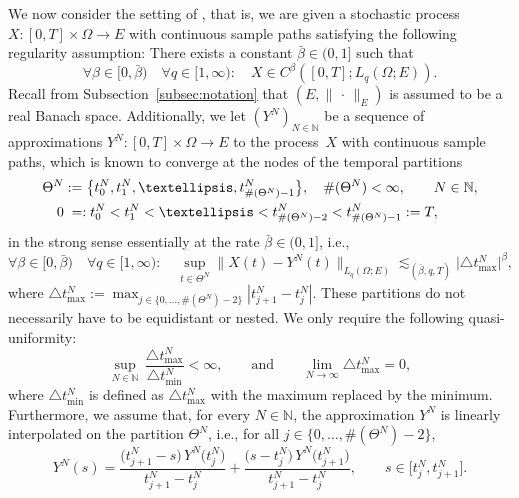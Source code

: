 \documentclass[reqno]{amsart}
\numberwithin{equation}{section}
\newcommand{\bbN}{\mathbb{N}}
\newcommand{\norm}[2]{     \| #1       \|_{ #2 }}
\newcommand{\from}{\colon}
\theoremstyle{remark}
\theoremstyle{definition}
\begin{document}
We now consider the 
setting of \cite[Section~5]{CoxEtAl2021}, 
that is, we are given  
a stochastic process 
$X\from[0,T]\times \Omega \to E$
with continuous sample paths 
satisfying the following regularity assumption: 
There exists a constant $\bar{\beta}\in(0,1]$ 
such that  
% 
\begin{equation}\label{eq:ass:X-beta-regularity} 
\forall \beta\in [0, \bar{\beta}) 
\quad 
\forall 
q\in[1,\infty): 
\quad 
X\in C^{\beta}([0,T];L_q(\Omega;E)). 
\end{equation}
%
Recall from Subsection~\ref{subsec:notation} 
that $(E,\norm{\,\cdot\,}{E})$  
is assumed to be a real Banach space. 
Additionally, we let 
$(Y^N)_{N\in\bbN}$ 
be a sequence 
of approximations 
$Y^N\!\from[0,T]\times\Omega\to E$ 
to the process~$X$ 
with continuous sample paths, 
which is known to converge at 
the nodes of the temporal partitions    
%
\begin{align*}
\Theta^N &:= \bigl\{ t_0^N , t_1^N, \ldots, t_{\#(\Theta^N)-1}^N \bigr\}, 
\quad  
\#(\Theta^N) < \infty, 
\qquad 
N\in\bbN, 
\\
0 &\textcolor{white}{:}=: t_0^N 
<  t_1^N 
< \ldots 
< t_{\#(\Theta^N)-2}^N  
< t_{\#(\Theta^N)-1}^N 
:= T , 
\end{align*}
% 
in the strong sense 
essentially at the rate $\bar{\beta}\in(0,1]$, 
i.e., 
%
\begin{equation}\label{eq:ass:conv-at-nodes}
\forall \beta\in [0,\bar{\beta}) 
\quad 
\forall q \in [1,\infty): 
\quad 
\sup\limits_{t\in\Theta^N} 
\bigl\| X(t) - Y^N\!(t) \bigr\|_{L_q(\Omega;E)} 
\lesssim_{(\bar{\beta},q,T)} 
\bigl| \triangle t^N_{\max} \bigr|^{\beta}\! , 
\end{equation} 
% 
where 
$\triangle t^N_{\max} 
:= 
\max_{j\in\{0,\ldots,\#(\Theta^N)-2\}} 
| t_{j+1}^N - t_j^N |$. 
These partitions 
do not necessarily 
have to be equidistant or nested. 
We only require the following 
quasi-uniformity: 
% 
\begin{equation}\label{eq:ass:grid} 
\sup_{N\in\bbN} \, \frac{ \triangle t^N_{\max}  }{ 
	\triangle t^N_{\min}  } < \infty, 
\qquad 
\text{and} 
\qquad 
\lim_{N\to \infty} \triangle t^N_{\max} = 0, 
\end{equation} 
% 
where 
$\triangle t^N_{\min}$ 
is defined as 
$\triangle t^N_{\max}$ 
with the maximum replaced by the minimum. 
Furthermore, we assume that, 
for every $N\in\bbN$, 
the approximation 
$Y^N$ is linearly interpolated 
on the partition $\Theta^N$\!, i.e., 
for all $j \in \{0,\ldots,\#(\Theta^N)-2\}$, 
% 
\begin{equation}\label{eq:def:linear-interpol} 
Y^N\!(s) 
= 
\frac{ \bigl(t_{j+1}^N - s \bigr) \, Y^N\! \bigl( t_j^N \bigr) }{
	t_{j+1}^N - t_j^N } 
+ 
\frac{ \bigl(s - t_j^N \bigr) \, Y^N\! \bigl(t_{j+1}^N \bigr) }{ 
	t_{j+1}^N - t_j^N }, 
\qquad 
s \in \bigl[ t_j^N, t_{j+1}^N \bigr]. 
\end{equation} 
% 
\end{document}
